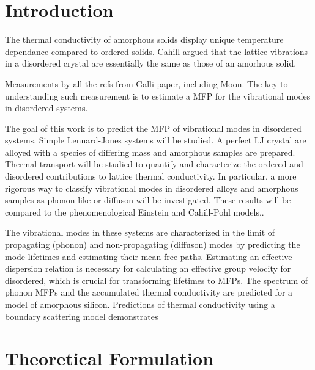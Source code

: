 \documentclass[aps,prb,twocolumn,superscriptaddress,footinbib,amsmath,amssymb,floatfix]{revtex4}
\begin{document}
\section{\label{S:Introduction}Introduction}
The thermal conductivity of amorphous solids display 
unique temperature dependance compared to ordered solids.
\cite{freeman_thermal_1986} 
Cahill argued that the lattice vibrations 
in a disordered crystal are essentially the same as those of an amorhous 
solid.
\cite{cahill_lower_1992} 

Measurements by all the refs from Galli paper, including Moon.
\cite{wada_thermal_1996,zink_thermal_2006,yang_anomalously_2010,
cahill_thermal_1994,kuo_thermal_1992,moon_thermal_2002,liu_high_2009}
The key to understanding such measurement is to estimate a MFP for the 
vibrational modes in disordered systems. 

The goal of this work is to predict the MFP of vibrational modes in 
disordered systems. Simple Lennard-Jones systems will be studied.  A 
perfect LJ crystal are alloyed with a species of differing mass and 
amorphous samples are prepared. Thermal transport will be studied to 
quantify and characterize the ordered and 
disordered contributions to lattice thermal conductivity. In particular, a 
more rigorous way to classify vibrational modes in disordered alloys and 
amorphous samples as phonon-like or diffuson will be investigated. These 
results will be compared to the phenomenological Einstein and Cahill-Pohl 
models,\cite{einstein1911,kittel1949,cahill1992}.

The vibrational modes in these systems are
characterized in the limit of propagating (phonon) and 
non-propagating (diffuson) modes by predicting the mode lifetimes and 
estimating their mean free paths. Estimating an effective dispersion
relation is necessary for calculating an effective group velocity for 
disordered, which is crucial for transforming lifetimes to MFPs.
The spectrum of phonon MFPs and the accumulated thermal conductivity 
are predicted for a model of amorphous silicon. Predictions of thermal 
conductivity using a boundary scattering model demonstrates  


\section{\label{S:Theory}Theoretical Formulation}
\end{document}

